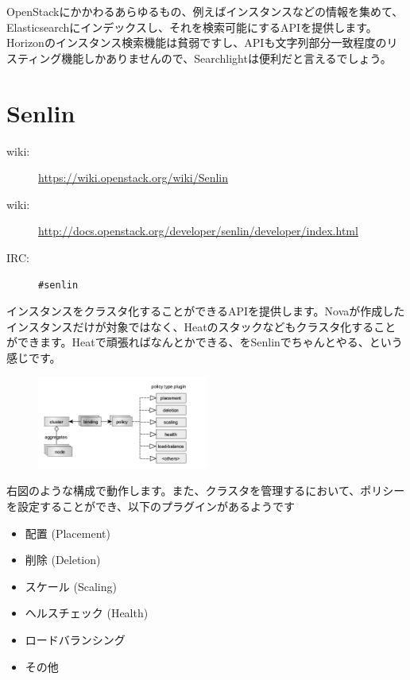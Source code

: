 OpenStackにかかわるあらゆるもの、例えばインスタンスなどの情報を集めて、Elasticsearchにインデックスし、それを検索可能にするAPIを提供します。Horizonのインスタンス検索機能は貧弱ですし、APIも文字列部分一致程度のリスティング機能しかありませんので、Searchlightは便利だと言えるでしょう。

\section{Senlin}

\begin{description}
	\item[wiki:] \url{https://wiki.openstack.org/wiki/Senlin}
	\item[wiki:] \url{http://docs.openstack.org/developer/senlin/developer/index.html}
	\item[IRC:] \verb|#senlin|
\end{description}

インスタンスをクラスタ化することができるAPIを提供します。Novaが作成したインスタンスだけが対象ではなく、Heatのスタックなどもクラスタ化することができます。Heatで頑張ればなんとかできる、をSenlinでちゃんとやる、という感じです。

\begin{figure}
	\vspace*{-2\intextsep}
	\begin{center}
		\includegraphics[width=0.5\textwidth]{img/Senlin-policies.png}
	\end{center}
\end{figure}

右図のような構成で動作します。また、クラスタを管理するにおいて、ポリシーを設定することができ、以下のプラグインがあるようです

\begin{itemize}
	\item 配置 (Placement)
	\item 削除 (Deletion)
	\item スケール (Scaling)
	\item ヘルスチェック (Health)
	\item ロードバランシング
	\item その他
\end{itemize}

